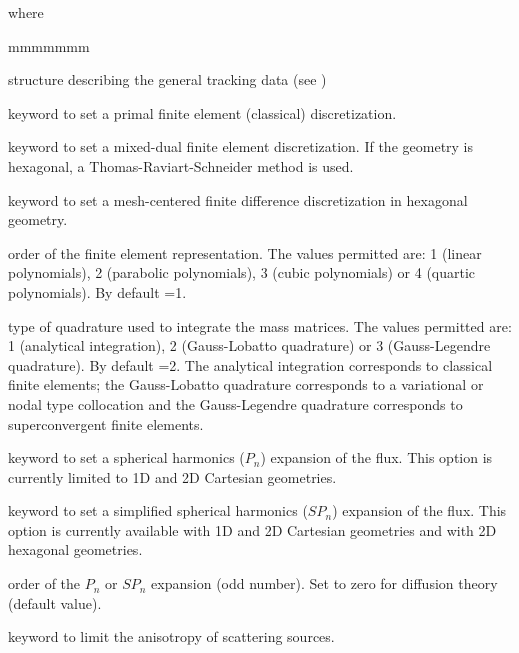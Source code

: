 \noindent where

\begin{ListeDeDescription}{mmmmmmm}

\item[\dstr{desctrack}] structure describing the general tracking data (see
)

\item[\moc{PRIM}] keyword to set a primal finite element (classical)
discretization.

\item[\moc{DUAL}] keyword to set a mixed-dual finite element discretization. If the
geometry is hexagonal, a Thomas-Raviart-Schneider method is used.

\item[\moc{MCFD}] keyword to set a mesh-centered finite difference discretization
in hexagonal geometry.

\item[\dusa{ielem}] order of the finite element representation.  The values
permitted are: 1 (linear polynomials), 2 (parabolic polynomials), 3 (cubic
polynomials) or 4 (quartic polynomials). By default =1.

\item[\dusa{icol}] type of quadrature used to integrate the mass matrices. The
values permitted are: 1 (analytical integration), 2  (Gauss-Lobatto quadrature)
or 3 (Gauss-Legendre quadrature). By default =2. The analytical
integration corresponds to classical finite elements; the Gauss-Lobatto
quadrature corresponds to a variational or nodal type collocation and the
Gauss-Legendre quadrature corresponds to superconvergent finite elements.

\item[\moc{PN}] keyword to set a spherical harmonics ($P_n$) expansion of the flux.\cite{nse2005} This option is currently limited to 1D
and 2D Cartesian geometries.

\item[\moc{SPN}] keyword to set a simplified spherical harmonics ($SP_n$) expansion
of the flux.\cite{nse2005,ane10a} This option is currently available with 1D and 2D Cartesian geometries
and with 2D hexagonal geometries.

\item[\dusa{n}] order of the $P_n$ or $SP_n$ expansion (odd number). Set to zero for diffusion theory (default value).

\item[\moc{SCAT}] keyword to limit the anisotropy of scattering sources.


\end{ListeDeDescription}
